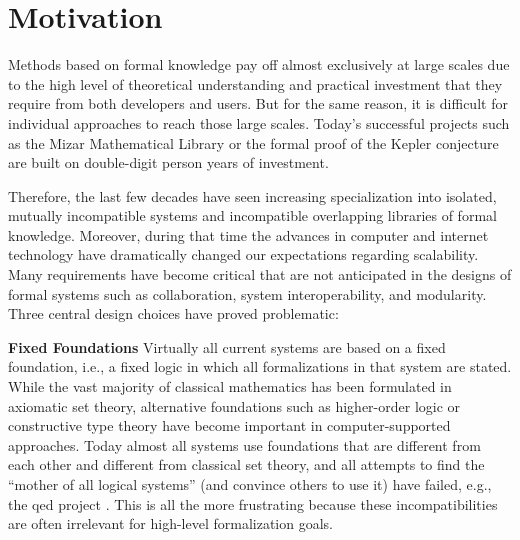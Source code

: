 \section{Motivation}\label{sec:motiv}

Methods based on formal knowledge pay off almost exclusively at large scales due to the high level of theoretical understanding and practical investment that they require from both developers and users.
But for the same reason, it is difficult for individual approaches to reach those large scales.
Today's successful projects such as the Mizar Mathematical Library \cite{mizar}
or the formal proof of the Kepler conjecture \cite{flyspeck}
are built on double-digit person years of investment.

Therefore, the last few decades have seen increasing specialization into isolated, mutually incompatible systems and incompatible overlapping libraries of formal knowledge.
Moreover, during that time the advances in computer and internet technology have dramatically changed our expectations regarding scalability.
Many requirements have become critical that are not anticipated in the designs of formal systems such as collaboration, system interoperability, and modularity.
Three central design choices have proved problematic:

{\bf Fixed Foundations}
Virtually all current systems are based on a fixed foundation, i.e., a fixed logic in which all formalizations in that system are stated.
While the vast majority of classical mathematics has been formulated in axiomatic set theory, alternative foundations such as higher-order logic or constructive type theory have become important in computer-supported approaches.
Today almost all systems use foundations that are different from each other and different from classical set theory, and all attempts to find the ``mother of all logical systems'' (and convince others to use it) have failed, e.g., the qed project \cite{qed}.
This is all the more frustrating because these incompatibilities are often irrelevant for high-level formalization goals.
  
